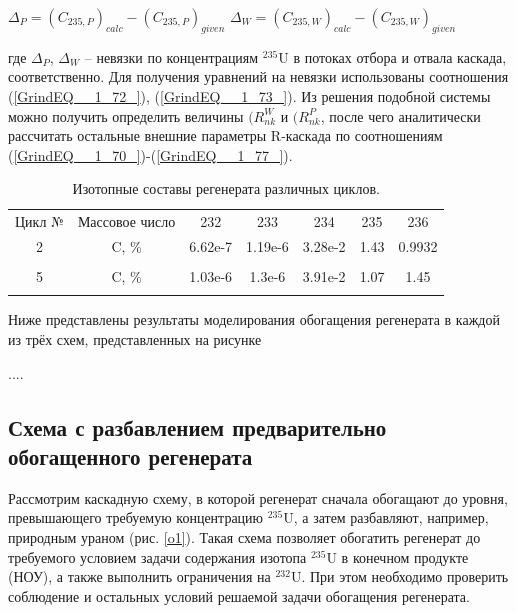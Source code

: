 $\Delta_{P} = {(C_{235, P})}_{calc}-{(C_{235, P})}_{given}$
$\Delta_{W} = {(C_{235, W})}_{calc}-{(C_{235, W})}_{given}$

где $\Delta_{P}$, $\Delta_{W}$ -- невязки по концентрациям $^{235}$U в потоках отбора и отвала каскада, соответственно. 
Для получения уравнений на невязки использованы соотношения (\ref{GrindEQ__1_72_}), (\ref{GrindEQ__1_73_}). Из решения подобной системы можно получить определить величины $(R_{n k}^{W}$ и $(R_{n k}^{P}$, после чего аналитически рассчитать остальные внешние параметры R-каскада по соотношениям (\ref{GrindEQ__1_70_})-(\ref{GrindEQ__1_77_}).   



\begin{table}[h]
  \centering
  \normalsize\begin{tabulary}{1.0\textwidth}{CCCCCCC}
  Цикл № & Массовое число & 232 & 233 & 234 & 235 & 236 \\
  2 & C, \% & 6.62e-7 & 1.19e-6 &    3.28e-2 & 1.43 & 0.9932 \\
   &  &  &  &  &  &  \\
  5 & C, \% &  1.03e-6 &   1.3e-6 &  3.91e-2 & 1.07 & 1.45 \\
   &  &  &  &  &  &  \\
  \end{tabulary}
  \caption{{Изотопные составы регенерата различных циклов.{\label{is_compositions_2_5}}}}
\end{table}


Ниже представлены результаты моделирования обогащения регенерата в каждой из трёх схем, представленных на рисунке 

.... 


\subsection{Схема с разбавлением предварительно обогащенного регенерата}

Рассмотрим каскадную схему, в которой регенерат сначала обогащают до уровня, превышающего требуемую концентрацию $^{235}$U, а затем разбавляют, например, природным ураном (рис. \ref{o1}). Такая схема позволяет обогатить регенерат до требуемого условием задачи содержания изотопа $^{235}$U в конечном продукте (НОУ), а также выполнить ограничения на $^{232}$U. При этом необходимо проверить соблюдение и остальных условий решаемой задачи обогащения регенерата.


